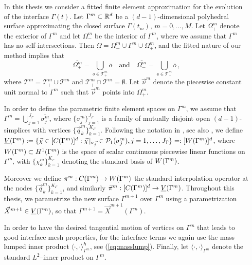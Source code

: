 In this thesis we consider a fitted finite element approximation for the
evolution of the interface $\Gamma(t)$. Let $\Gamma^{m}\subset{\mathbb R}^d$ be a
$(d-1)$-dimensional polyhedral surface approximating the closed surface
$\Gamma(t_m)$, $m=0 ,\ldots, M$. Let $\Omega^m_+$ denote the exterior of
$\Gamma^m$ and let $\Omega^m_-$ be the interior of $\Gamma^m$, where we assume
that $\Gamma^m$ has no self-intersections. Then
$\Omega = \Omega_-^m \cup \Gamma^m \cup \Omega_+^m$, and the fitted nature of
our method implies that
\begin{equation} \label{eq:fittedO}
\overline{\Omega^m_+} = \bigcup_{o \in \mathcal{T}^m_+} \overline{o}
\quad\text{and}\quad
\overline{\Omega^m_-} = \bigcup_{o \in \mathcal{T}^m_-} \overline{o} \,,
\end{equation}
where $\mathcal{T}^m = \mathcal{T}^m_+ \cup \mathcal{T}^m_-$ and
$\mathcal{T}^m_+ \cap \mathcal{T}^m_- = \emptyset$.
Let $\vec{\nu}^m$ denote the piecewise constant unit normal to $\Gamma^m$
such that $\vec\nu^m$ points into $\Omega^m_+$.

In order to define the parametric finite element spaces on $\Gamma^m$, we
assume that $\Gamma^m=\bigcup_{j=1}^{J_\Gamma} \overline{\sigma^m_j}$, where
$\{\sigma^m_j\}_{j=1}^{J_\Gamma}$ is a family of mutually disjoint open
$(d-1)$-simplices with vertices $\{\vec{q}^m_k\}_{k=1}^{K_\Gamma}$. Following
the notation in \cite{spurious}, see also \cite{gflows3d}, we define
$\underline{V}(\Gamma^m) := \{\vec\chi \in [C(\Gamma^m)]^d:\vec\chi\!\mid_{\sigma^m_j}
\in \mathcal{P}_1(\sigma^m_j), j=1,\ldots, J_\Gamma\} =: [W(\Gamma^m)]^d$,
where $W(\Gamma^m) \subset H^1(\Gamma^m)$ is the space of scalar continuous
piecewise linear functions on $\Gamma^m$, with $\{\chi^m_k\}_{k=1}^{K_\Gamma}$
denoting the standard basis of $W(\Gamma^m)$.

Moreover we define $\pi^m: C(\Gamma^m)\to W(\Gamma^m)$ the standard interpolation
operator at the nodes $\{\vec{q}_k^m\}_{k=1}^{K_\Gamma}$, and similarly
$\vec\pi^m: [C(\Gamma^m)]^d\to \underline{V}(\Gamma^m)$. Throughout this thesis, we parametrize
the new surface $\Gamma^{m+1}$ over $\Gamma^m$ using a parametrization
$\vec{X}^{m+1} \in \underline{V}(\Gamma^m)$, so that $\Gamma^{m+1} = \vec{X}^{m+1}(\Gamma^m)$.

In order to have the desired tangential motion of vertices on $\Gamma^m$
that leads to good interface mesh properties, for the interface terms we again
use the mass lumped inner product $\langle\cdot,\cdot\rangle_{\Gamma^m}^h$, see
(\ref{eq:masslump}). Finally, let $\langle\cdot,\cdot\rangle_{\Gamma^m}$ denote
the standard $L^2$--inner product on $\Gamma^m$.

